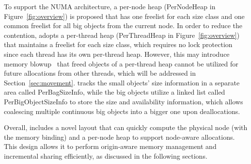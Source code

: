To support the NUMA architecture, a per-node heap (PerNodeHeap in Figure~\ref{fig:overview}) is proposed that has one freelist for each size class and one common freelist for all big objects from the current node. 
In order to reduce the contention, \NM{} adopts a per-thread heap (PerThreadHeap in Figure~\ref{fig:overview}) that maintains a freelist for each size class, which requires no lock protection since each thread has its own per-thread heap. However, this may introduce memory blowup~\cite{Hoard} that freed objects of a per-thread heap cannot be utilized for future allocations from other threads, which will be addressed in Section~\ref{sec:movement}. 
\NM{} tracks the small objects' size information in a separate area called PerBagSizeInfo, while the big objects utilize a linked list called PerBigObjectSizeInfo to store the size and availability information, which allows coalescing multiple continuous big objects into a bigger one upon deallocations.



Overall, \NM{} includes a novel layout that can quickly compute the physical node (with the memory binding) and a per-node heap to support node-aware allocations. This design allows it to perform origin-aware memory management and incremental sharing efficiently, as discussed in the following sections.

